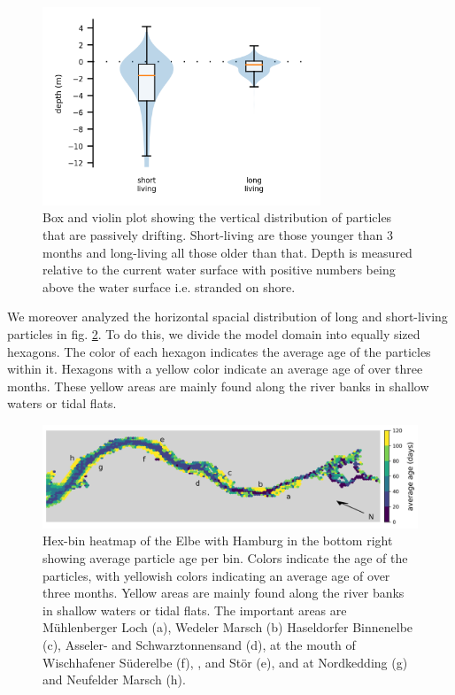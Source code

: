 \documentclass[npg, manuscript]{copernicus}
\begin{document}
\begin{figure}
    \includegraphics[width=8.3cm]{retention_boxplot.png}
    \caption[]{Box and violin plot showing the vertical distribution of particles that are passively drifting.  Short-living are those younger than 3 months and long-living all those older than that. Depth is measured relative to the current water surface with positive numbers being above the water surface i.e. stranded on shore.}
    \label{fig:migration-long-vs-short}
\end{figure}

We moreover analyzed the horizontal spacial distribution of long and short-living particles in fig. \ref{fig:migration-long-vs-short-heatmap}.
To do this, we divide the model domain into equally sized hexagons.
The color of each hexagon indicates the average age of the particles within it.
Hexagons with a yellow color indicate an average age of over three months.
These yellow areas are mainly found along the river banks in shallow waters or tidal flats.

\begin{figure}
    \includegraphics[width=12cm]{age_hexbin.png}
    \caption[]{
        Hex-bin heatmap of the Elbe with Hamburg in the bottom right showing average particle age per bin.
        Colors indicate the age of the particles, with yellowish colors indicating an average age of over three months.
        Yellow areas are mainly found along the river banks in shallow waters or tidal flats.
        The important areas are Mühlenberger Loch (a), Wedeler Marsch (b) Haseldorfer Binnenelbe (c), Asseler- and Schwarztonnensand (d), at the mouth of Wischhafener Süderelbe (f), , and Stör (e), and at Nordkedding (g) and Neufelder Marsch (h).
    }
    \label{fig:migration-long-vs-short-heatmap}
\end{figure}
\end{document}
